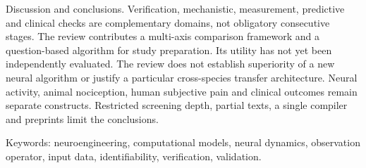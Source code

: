 \documentclass[12pt,a4paper]{article}
\begin{document}
Discussion and conclusions. Verification, mechanistic, measurement, predictive and clinical checks are complementary domains, not obligatory consecutive stages. The review contributes a multi-axis comparison framework and a question-based algorithm for study preparation. Its utility has not yet been independently evaluated. The review does not establish superiority of a new neural algorithm or justify a particular cross-species transfer architecture. Neural activity, animal nociception, human subjective pain and clinical outcomes remain separate constructs. Restricted screening depth, partial texts, a single compiler and preprints limit the conclusions.\par
\noindent\begin{minipage}{\linewidth}Keywords: neuroengineering, computational models, neural dynamics, observation operator, input data, identifiability, verification, validation.\end{minipage}\par
\end{document}
